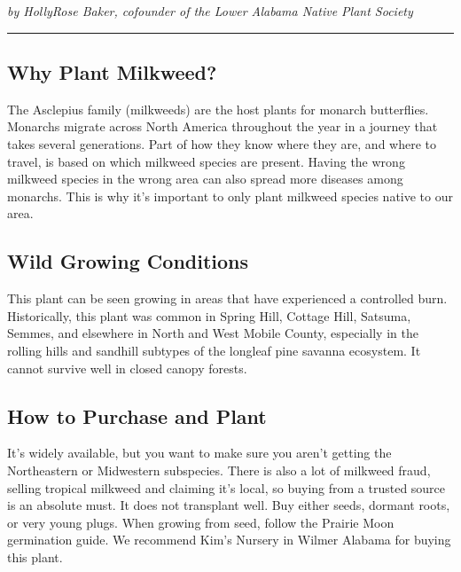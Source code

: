 \documentclass[
]{book}
\begin{document}
\emph{by HollyRose Baker, cofounder of the Lower Alabama Native Plant Society}

\begin{center}\rule{0.5\linewidth}{0.5pt}\end{center}

\subsection*{Why Plant Milkweed?}\label{why-plant-milkweed}

The Asclepius family (milkweeds) are the host plants for monarch butterflies. Monarchs migrate across North America throughout the year in a journey that takes several generations. Part of how they know where they are, and where to travel, is based on which milkweed species are present. Having the wrong milkweed species in the wrong area can also spread more diseases among monarchs. This is why it's important to only plant milkweed species native to our area.

\subsection*{Wild Growing Conditions}\label{wild-growing-conditions}

This plant can be seen growing in areas that have experienced a controlled burn. Historically, this plant was common in Spring Hill, Cottage Hill, Satsuma, Semmes, and elsewhere in North and West Mobile County, especially in the rolling hills and sandhill subtypes of the longleaf pine savanna ecosystem. It cannot survive well in closed canopy forests.

\subsection*{How to Purchase and Plant}\label{how-to-purchase-and-plant}

It's widely available, but you want to make sure you aren't getting the Northeastern or Midwestern subspecies. There is also a lot of milkweed fraud, selling tropical milkweed and claiming it's local, so buying from a trusted source is an absolute must. It does not transplant well. Buy either seeds, dormant roots, or very young plugs. When growing from seed, follow the Prairie Moon germination guide. We recommend Kim's Nursery in Wilmer Alabama for buying this plant.
\end{document}
